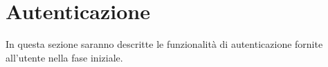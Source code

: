 %

\section{Autenticazione} %
\label{sec:autenticazione}
	In questa sezione saranno descritte le funzionalità di autenticazione\gloss{} fornite all'utente nella fase iniziale.


